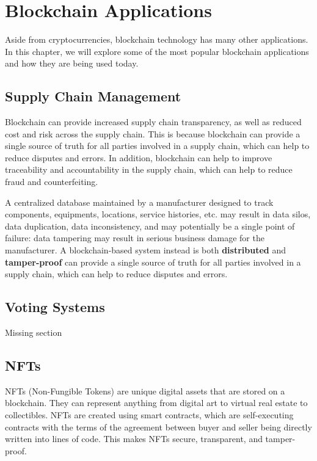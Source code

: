 \chapter{Blockchain Applications}
Aside from cryptocurrencies, blockchain technology has many other applications. In this chapter, we will explore some of the most popular blockchain applications and how they are being used today.

\section{Supply Chain Management}
Blockchain can provide increased supply chain transparency, as well as
reduced cost and risk across the supply chain. This is because blockchain can provide a single source of truth for all parties involved in a supply chain, which can help to reduce disputes and errors. In addition, blockchain can help to improve traceability and accountability in the supply chain, which can help to reduce fraud and counterfeiting.

A centralized database maintained by a manufacturer designed to track components, equipments, locations, service histories, etc. may result in data silos, data duplication, data inconsistency, and may potentially be a single point of failure: data tampering may result in serious business damage for the manufacturer.
A blockchain-based system instead is both \textbf{distributed} and \textbf{tamper-proof} can provide a single source of truth for all parties involved in a supply chain, which can help to reduce disputes and errors.

\section{Voting Systems}

Missing section

\section{NFTs}
NFTs (Non-Fungible Tokens) are unique digital assets that are stored on a blockchain. They can represent anything from digital art to virtual real estate to collectibles. NFTs are created using smart contracts, which are self-executing contracts with the terms of the agreement between buyer and seller being directly written into lines of code. This makes NFTs secure, transparent, and tamper-proof.

